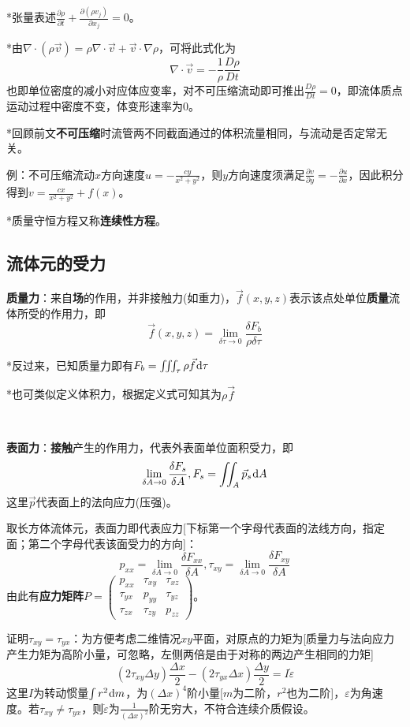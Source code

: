 \documentclass[a4paper,UTF8,fontset=windows]{ctexart}
\newcommand*{\dr}{\hspace{0.07em}\mathrm{d}}
\begin{document}
*张量表述$\frac{\partial\rho}{\partial t}+\frac{\partial(\rho v_j)}{\partial x_j}=0$。

*由$\nabla\cdot(\rho\vec{v})=\rho\nabla\cdot\vec{v}+\vec{v}\cdot\nabla\rho$，可将此式化为
$$\nabla\cdot\vec{v}=-\frac{1}{\rho}\frac{D\rho}{Dt}$$
也即单位密度的减小对应体应变率，对不可压缩流动即可推出$\frac{D\rho}{Dt}=0$，即流体质点运动过程中密度不变，体变形速率为0。

*回顾前文\textbf{不可压缩}时流管两不同截面通过的体积流量相同，与流动是否定常无关。

例：不可压缩流动$x$方向速度$u=-\frac{cy}{x^2+y^2}$，则$y$方向速度须满足$\frac{\partial v}{\partial y}=-\frac{\partial u}{\partial x}$，因此积分得到$v=\frac{cx}{x^2+y^2}+f(x)$。

*质量守恒方程又称\textbf{连续性方程}。

\subsection{流体元的受力}

\textbf{质量力}：来自\textbf{场}的作用，并非接触力(如重力)，$\vec{f}(x,y,z)$表示该点处单位\textbf{质量}流体所受的作用力，即
$$\vec{f}(x,y,z)=\lim_{\delta\tau\to0}\frac{\delta F_b}{\rho\delta\tau}$$

*反过来，已知质量力即有$F_b=\iiint_\tau\rho\vec{f}\dr\tau$

*也可类似定义体积力，根据定义式可知其为$\rho\vec{f}$

\

\textbf{表面力}：\textbf{接触}产生的作用力，代表外表面单位面积受力，即
$$\lim_{\delta A\to0}\frac{\delta F_s}{\delta A},F_s=\iint_A\vec{p}_s\dr A$$
这里$\vec{p}$代表面上的法向应力(压强)。

取长方体流体元，表面力即代表应力[下标第一个字母代表面的法线方向，指定面；第二个字母代表该面受力的方向]：
$$p_{xx}=\lim_{\delta A\to0}\frac{\delta F_{xx}}{\delta A},\tau_{xy}=\lim_{\delta A\to0}\frac{\delta F_{xy}}{\delta A}$$
由此有\textbf{应力矩阵}$P=\begin{pmatrix}p_{xx}&\tau_{xy}&\tau_{xz}\\\tau_{yx}&p_{yy}&\tau_{yz}\\\tau_{zx}&\tau_{zy}&p_{zz}\end{pmatrix}$。

证明$\tau_{xy}=\tau_{yx}$：为方便考虑二维情况$xy$平面，对原点的力矩为[质量力与法向应力产生力矩为高阶小量，可忽略，左侧两倍是由于对称的两边产生相同的力矩]
$$(2\tau_{xy}\Delta y)\frac{\Delta x}{2}-(2\tau_{yx}\Delta x)\frac{\Delta y}{2}=I\dot{\varepsilon}$$
这里$I$为转动惯量$\int r^2\dr m$，为$(\Delta x)^4$阶小量[$m$为二阶，$r^2$也为二阶]，$\varepsilon$为角速度。若$\tau_{xy}\ne\tau_{yx}$，则$\dot{\varepsilon}$为$\frac{1}{(\Delta x)^2}$阶无穷大，不符合连续介质假设。
\end{document}
